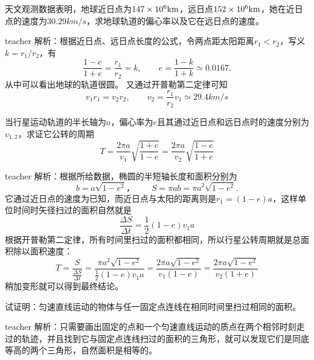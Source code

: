 \begin{example}
天文观测数据表明，地球近日点为$147\times 10^{6}{\rm{km}}$，远日点$152\times 10^{6}{\rm{km}}$，她在近日点的速度为$30.29\unit{km/s}$，求地球轨道的偏心率以及它在远日点的速度。
\begin{taggedblock}{teacher}
\newline
解析：根据近日点、远日点长度的公式，令两点距太阳距离$r_1<r_2$，写义$k=r_1/r_2$，有
\[ \frac{1-e}{1+e} = \frac{r_1}{r_2}=k,\qquad e = \frac{1-k}{1+k}\simeq 0.0167. \]
从中可以看出地球的轨道很圆。
又通过开普勒第二定律可知
\[v_1r_1 = v_2r_2,\qquad v_2 = \frac{r_1}{r_2}v_1\simeq 29.4\unit{km/s}\]
\end{taggedblock}
\end{example}

\begin{example}
当行星运动轨道的半长轴为$a$，偏心率为$e$且其通过近日点和远日点时的速度分别为$v_{1,2}$，求证它公转的周期
\[  T = \frac{2\pi a}{v_1}\sqrt{\frac{1+e}{1-e}}  = \frac{2\pi a}{v_2}\sqrt{\frac{1-e}{1+e}} \]
\begin{taggedblock}{teacher}
\newline
解析：根据所给数据，椭圆的半短轴长度和面积分别为
\[b = a\sqrt{1-e^2}，\qquad S = \pi a b = \pi a^2\sqrt{1-e^2}.\]
它通过近日点的速度为已知，而近日点与太阳的距离则是$r_1 = (1-e)a$，这样单位时间时矢径扫过的面积自然就是
\[
\frac{\Delta S}{\Delta t} = \frac{1}{2}(1-e)v_1a
\]
根据开普勒第二定律，所有时间里扫过的面积都相同，所以行星公转周期就是总面积除以面积速度：
\[
T = \frac{S}{\frac{\Delta S}{\Delta t}} = \frac{\pi a^2\sqrt{1-e^2}}{\frac{1}{2}(1-e)v_1a} = \frac{2\pi a \sqrt{1-e^2}}{v_1(1-e)}=\frac{2\pi a \sqrt{1-e^2}}{v_2(1+e)}
\]
稍加变形就可以得到最终结论。
\end{taggedblock}
\end{example}

\begin{example}
试证明：匀速直线运动的物体与任一固定点连线在相同时间里扫过相同的面积。
\begin{taggedblock}{teacher}
\newline
解析：只需要画出固定的点和一个匀速直线运动的质点在两个相邻时刻走过的轨迹，并且找到它与固定点连线扫过的面积的三角形，就可以发现它们是同底等高的两个三角形，自然面积是相等的。
\end{taggedblock}
\end{example}

